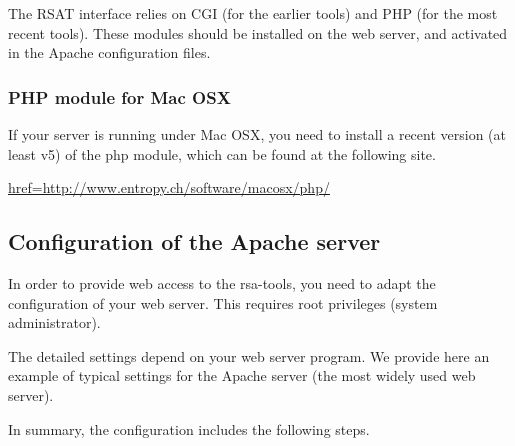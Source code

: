 \documentclass[12pt,a4paper, twoside]{scrreprt} %
\begin{document}
The RSAT interface relies on CGI (for the earlier tools) and PHP (for
the most recent tools). These modules should be installed on the web
server, and activated in the Apache configuration files. 

\subsubsection{PHP module for Mac OSX}

If your server is running under Mac OSX, you need to install a recent
version (at least v5) of the php module, which can be found at the following site. 

\url{href=http://www.entropy.ch/software/macosx/php/}

\subsection{Configuration of the Apache server}

In order to provide web access to the rsa-tools, you need to adapt the
configuration of your web server. This requires root privileges
(system administrator). 


The detailed settings depend on your web server program. We provide
here an example of typical settings for the Apache server (the most
widely used web server).

In summary, the configuration includes the following steps.
\end{document}
